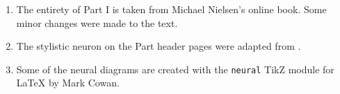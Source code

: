 \begin{enumerate}
\item 
The entirety of Part I is taken from Michael Nielsen's online book\cite{Nielsen2015}. Some minor changes were made to the text.

\item
The stylistic neuron on the Part header pages were adapted from \cite{Erler2004}. 

\item
Some of the neural diagrams  are created with the \lstinline{neural} TikZ module for \LaTeX{}\cite{cowan2019} by Mark Cowan.
\end{enumerate}
